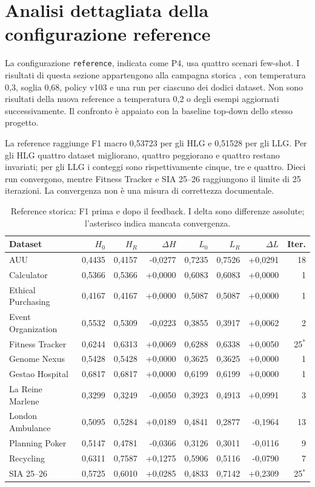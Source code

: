 \section{Analisi dettagliata della configurazione reference}
\label{sec:reference-dataset-analysis}
La configurazione \texttt{reference}, indicata come P4, usa quattro scenari
few-shot. I risultati di questa sezione appartengono alla campagna storica
, con temperatura 0,3, soglia 0,68,
policy v103 e una run per ciascuno dei dodici dataset. Non sono risultati
della nuova reference a temperatura 0,2 o degli esempi aggiornati successivamente.
Il confronto è appaiato con la baseline top-down dello stesso progetto.

La reference raggiunge F1 macro 0,53723 per gli HLG e 0,51528 per gli LLG.
Per gli HLG quattro dataset migliorano, quattro peggiorano e quattro restano
invariati; per gli LLG i conteggi sono rispettivamente cinque, tre e quattro.
Dieci run convergono, mentre Fitness Tracker e SIA 25--26 raggiungono il limite
di 25 iterazioni. La convergenza non è una misura di correttezza documentale.

\begin{table}[htbp]
\centering
\small
\caption{Reference storica: F1 prima e dopo il feedback. I delta sono differenze assolute; l’asterisco indica mancata convergenza.}
\label{tab:reference-before-after}
\begin{tabular}{lrrrrrrr}
\toprule
Dataset & $H_0$ & $H_R$ & $\Delta H$ & $L_0$ & $L_R$ & $\Delta L$ & Iter. \\
\midrule
AUU & 0,4435 & 0,4157 & -0,0277 & 0,7235 & 0,7526 & +0,0291 & 18 \\
Calculator & 0,5366 & 0,5366 & +0,0000 & 0,6083 & 0,6083 & +0,0000 & 1 \\
Ethical Purchasing & 0,4167 & 0,4167 & +0,0000 & 0,5087 & 0,5087 & +0,0000 & 1 \\
Event Organization & 0,5532 & 0,5309 & -0,0223 & 0,3855 & 0,3917 & +0,0062 & 2 \\
Fitness Tracker & 0,6244 & 0,6313 & +0,0069 & 0,6288 & 0,6338 & +0,0050 & 25$^{*}$ \\
Genome Nexus & 0,5428 & 0,5428 & +0,0000 & 0,3625 & 0,3625 & +0,0000 & 1 \\
Gestao Hospital & 0,6817 & 0,6817 & +0,0000 & 0,6199 & 0,6199 & +0,0000 & 1 \\
La Reine Marlene & 0,3299 & 0,3249 & -0,0050 & 0,3923 & 0,4913 & +0,0991 & 3 \\
London Ambulance & 0,5095 & 0,5284 & +0,0189 & 0,4841 & 0,2877 & -0,1964 & 13 \\
Planning Poker & 0,5147 & 0,4781 & -0,0366 & 0,3126 & 0,3011 & -0,0116 & 9 \\
Recycling & 0,6311 & 0,7587 & +0,1275 & 0,5906 & 0,5116 & -0,0790 & 7 \\
SIA 25--26 & 0,5725 & 0,6010 & +0,0285 & 0,4833 & 0,7142 & +0,2309 & 25$^{*}$ \\
\bottomrule
\end{tabular}
\end{table}

